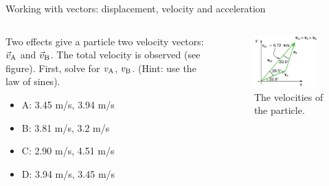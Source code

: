 \documentclass{beamer}
\begin{document}
\begin{frame}{Working with vectors: displacement, velocity and acceleration}
\begin{columns}[T]
\begin{column}{0.5\textwidth}
\small Two effects give a particle two velocity vectors: $\vec{v}_{\rm A}$ and $\vec{v}_{\rm B}$.  The total velocity is observed (see figure).  First, solve for $v_{\rm A}$, $v_{\rm B}$. (Hint: use the law of sines).
\begin{itemize}
\item A: 3.45 m/s, 3.94 m/s
\item B:  3.81 m/s, 3.2 m/s
\item C: 2.90 m/s, 4.51 m/s
\item D: 3.94 m/s, 3.45 m/s
\end{itemize}
\end{column}
\begin{column}{0.5\textwidth}
\begin{figure}
\centering
\includegraphics[width=0.9\textwidth]{figures/vecdiag2.png}
\caption{\label{fig:vecdiag2} The velocities of the particle.}
\end{figure}
\end{column}
\end{columns}
\end{frame}
\end{document}
